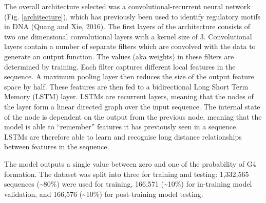 \documentclass[12pt,a4paper,]{report}
\begin{document}
The overall architecture selected was a convolutional-recurrent neural
network (Fig. \ref{architecture}), which has previously been used to
identify regulatory motifs in DNA (Quang and Xie, 2016). The first
layers of the architecture consists of two one dimensional convolutional
layers with a kernel size of 3. Convolutional layers contain a number of
separate filters which are convolved with the data to generate an output
function. The values (aka weights) in these filters are determined by
training. Each filter captures different local features in the sequence.
A maximum pooling layer then reduces the size of the output feature
space by half. These features are then fed to a bidirectional Long Short
Term Memory (LSTM) layer. LSTMs are recurrent layers, meaning that the
nodes of the layer form a linear directed graph over the input sequence.
The internal state of the node is dependent on the output from the
previous node, meaning that the model is able to ``remember'' features
it has previously seen in a sequence. LSTMs are therefore able to learn
and recognise long distance relationships between features in the
sequence.

The model outputs a single value between zero and one of the probability
of G4 formation. The dataset was split into three for training and
testing: 1,332,565 sequences (\textasciitilde{}80\%) were used for
training, 166,571 (\textasciitilde{}10\%) for in-training model
validation, and 166,576 (\textasciitilde{}10\%) for post-training model
testing.

\newpage
\end{document}
